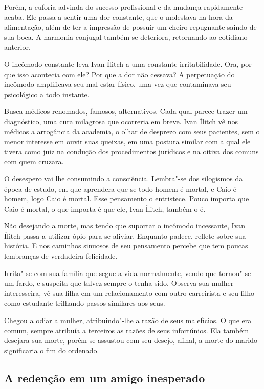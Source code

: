 \documentclass[12pt]{extarticle}
\begin{document}
Porém, a euforia advinda
do sucesso profissional e da mudança rapidamente acaba. Ele passa a
sentir uma dor constante, que o molestava na hora da alimentação, além
de ter a impressão de possuir um cheiro repugnante saindo de sua boca. A
harmonia conjugal também se deteriora, retornando ao cotidiano anterior.

O incômodo constante leva Ivan Ílitch a uma constante irritabilidade.
Ora, por que isso acontecia com ele? Por que a dor não cessava? A
perpetuação do incômodo amplificava seu mal estar físico, uma vez que
contaminava seu psicológico a todo instante.

Busca médicos renomados, famosos, alternativos. Cada qual parece trazer
um diagnóstico, uma cura milagrosa que ocorreria em breve. Ivan Ílitch
vê nos médicos a arrogância da academia, o olhar de
desprezo com seus pacientes, sem o menor interesse em ouvir suas
queixas, em uma postura similar com a qual ele tivera como juiz na
condução dos procedimentos jurídicos e na oitiva dos comuns com quem
cruzara.

O desespero vai lhe consumindo a consciência. Lembra"-se dos silogismos
da época de estudo, em que aprendera que se todo homem é mortal, e Caio
é homem, logo Caio é mortal. Esse pensamento o entristece. Pouco importa
que Caio é mortal, o que importa é que ele, Ivan Ílitch, também o é.

Não desejando a morte, mas tendo que suportar o incômodo incessante,
Ivan Ílitch passa a utilizar ópio para se aliviar. Enquanto padece,
reflete sobre sua história. E nos caminhos sinuosos de seu pensamento
percebe que tem poucas lembranças de verdadeira felicidade.

Irrita"-se com sua família que segue a vida normalmente, vendo que
tornou"-se um fardo, e suspeita que talvez sempre o tenha sido. Observa
sua mulher interesseira, vê sua filha em um relacionamento com outro
carreirista e seu filho como estudante trilhando passos similares aos
seus.

Chegou a odiar a mulher, atribuindo"-lhe a razão de seus malefícios. O
que era comum, sempre atribuía a terceiros as razões de seus
infortúnios. Ela também desejara sua morte, porém se assustou com seu
desejo, afinal, a morte do marido significaria o fim do ordenado.

\subsection{A redenção em um amigo inesperado}
\end{document}
